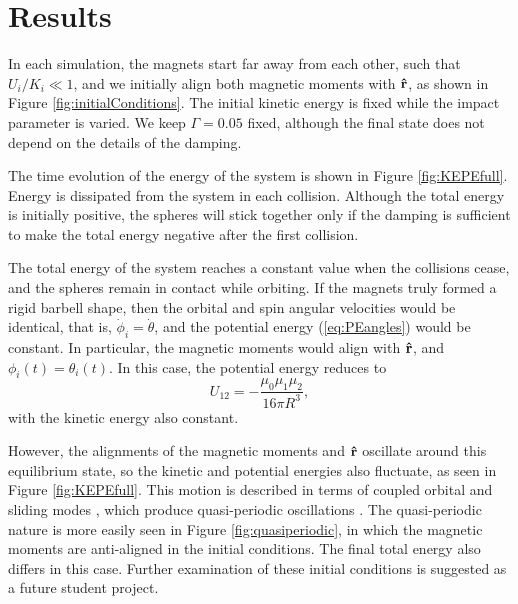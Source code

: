\documentclass{article}
\begin{document}
\section{Results}

In each simulation,  the magnets start far away from each other, such that $U_i/K_i \ll 1$, and we initially align both magnetic moments with $\vu{r} $, as shown in Figure \ref{fig:initialConditions}. The initial kinetic energy is fixed while the impact parameter is varied. We keep $\Gamma =0.05$ fixed, although the final state does not depend on the details of the damping. 

The time evolution of the energy of the system is shown in Figure \ref{fig:KEPEfull}. 
Energy is dissipated from the system in each collision. 
Although the total energy is initially positive, the spheres will stick together only if the damping is sufficient to make the total energy negative after the first collision.

The total energy of the system reaches a constant value when the collisions cease, and the spheres remain in contact while orbiting.
If the magnets truly formed a rigid barbell shape, then the orbital and spin angular velocities would be identical, that is, $\Dot{\phi}_i=\Dot{\theta}$, and the potential energy (\ref{eq:PEangles}) would be constant. 
In particular, the magnetic moments would align with $\vu{r}$, and $\phi_i(t)=\theta_i(t)$. In this case, the potential energy reduces to
\begin{equation}
    U_{12}=-\frac{\mu_0\mu_1\mu_2}{16\pi R^3}, 
\end{equation}
with the kinetic energy also constant. 

However, the alignments of the magnetic moments and $\vu{r}$ oscillate around this equilibrium state, 
so the kinetic and potential energies also fluctuate, as seen in Figure \ref{fig:KEPEfull}. 
This motion is described in terms of coupled orbital and sliding modes \cite{Haugen2020}, which produce quasi-periodic oscillations \cite{Edwards2017b}.
The quasi-periodic nature is more easily seen in Figure \ref{fig:quasiperiodic}, in which the magnetic moments are anti-aligned in the initial conditions. The final total energy also differs in this case. Further examination of these initial conditions is suggested as a future student project.
\end{document}
